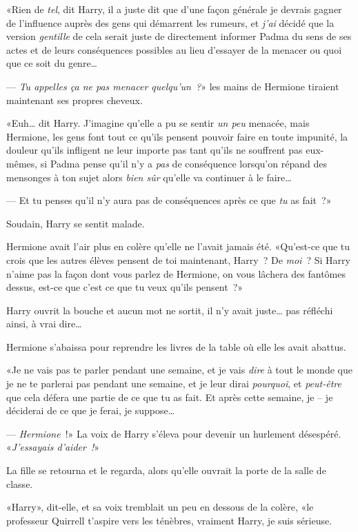 «Rien de \emph{tel}, dit Harry, il a juste dit que d'une façon générale je devrais gagner de l'influence auprès des gens qui démarrent les rumeurs, et \emph{j'ai} décidé que la version \emph{gentille} de cela serait juste de directement informer Padma du sens de ses actes et de leurs conséquences possibles au lieu d'essayer de la menacer ou quoi que ce soit du genre…

--- \emph{Tu appelles ça ne pas menacer quelqu'un~?}» les mains de Hermione tiraient maintenant ses propres cheveux.

«Euh… dit Harry. J'imagine qu'elle a pu se sentir \emph{un peu} menacée, mais Hermione, les gens font tout ce qu'ils pensent pouvoir faire en toute impunité, la douleur qu'ils infligent ne leur importe pas tant qu'ils ne souffrent pas eux-mêmes, si Padma pense qu'il n'y a \emph{pas} de conséquence lorsqu'on répand des mensonges à ton sujet alors \emph{bien sûr} qu'elle va continuer à le faire…

--- Et tu penses qu'il n'y aura pas de conséquences après ce que \emph{tu} as fait~?»

Soudain, Harry se sentit malade.

Hermione avait l'air plus en colère qu'elle ne l'avait jamais été. «Qu'est-ce que tu crois que les autres élèves pensent de toi maintenant, Harry~? De \emph{moi}~? Si Harry n'aime pas la façon dont vous parlez de Hermione, on vous lâchera des fantômes dessus, est-ce que c'est ce que tu veux qu'ils pensent~?»

Harry ouvrit la bouche et aucun mot ne sortit, il n'y avait juste… pas réfléchi ainsi, à vrai dire…

Hermione s'abaissa pour reprendre les livres de la table où elle les avait abattus.

«Je ne vais pas te parler pendant une semaine, et je vais \emph{dire} à tout le monde que je ne te parlerai pas pendant une semaine, et je leur dirai \emph{pourquoi}, et \emph{peut-être} que cela défera une partie de ce que tu as fait. Et après cette semaine, je -- je déciderai de ce que je ferai, je suppose…

--- \emph{Hermione}~!» La voix de Harry s'éleva pour devenir un hurlement désespéré. «\emph{J'essayais d'aider~!}»

La fille se retourna et le regarda, alors qu'elle ouvrait la porte de la salle de classe.

«Harry», dit-elle, et sa voix tremblait un peu en dessous de la colère, «le professeur Quirrell t'aspire vers les ténèbres, vraiment Harry, je suis sérieuse.

